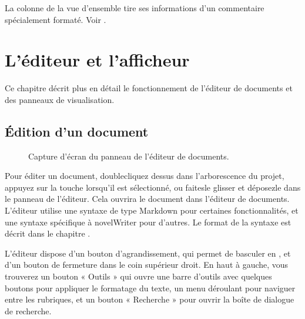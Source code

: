 \documentclass[a4paper,11pt,french]{sphinxmanual}
\begin{document}
\sphinxAtStartPar
La colonne  de la vue d’ensemble tire ses informations d’un commentaire spécialement formaté. Voir {\hyperref[\detokenize{usage_format:a-fmt-comm}]{}}.

\sphinxstepscope


\chapter{L’éditeur et l’afficheur}
\label{\detokenize{usage_writing:the-editor-and-viewer}}\label{\detokenize{usage_writing:a-ui-writing}}\label{\detokenize{usage_writing::doc}}
\sphinxAtStartPar
Ce chapitre décrit plus en détail le fonctionnement de l’éditeur de documents et des panneaux de visualisation.


\section{Édition d’un document}
\label{\detokenize{usage_writing:editing-a-document}}\label{\detokenize{usage_writing:a-ui-edit}}
\begin{figure}[htbp]
\centering
\capstart

\noindent{}
\caption{Capture d’écran du panneau de l’éditeur de documents.}\label{\detokenize{usage_writing:id1}}\end{figure}

\sphinxAtStartPar
Pour éditer un document, double\sphinxhyphen{}cliquez dessus dans l’arborescence du projet, appuyez sur la touche  lorsqu’il est sélectionné, ou faites\sphinxhyphen{}le glisser et déposez\sphinxhyphen{}le dans le panneau de l’éditeur. Cela ouvrira le document dans l’éditeur de documents. L’éditeur utilise une syntaxe de type Markdown pour certaines fonctionnalités, et une syntaxe spécifique à novelWriter pour d’autres. Le format de la syntaxe est décrit dans le chapitre {\hyperref[\detokenize{usage_format:a-fmt}]{}}.

\sphinxAtStartPar
L’éditeur dispose d’un bouton d’agrandissement, qui permet de basculer en , et d’un bouton de fermeture dans le coin supérieur droit. En haut à gauche, vous trouverez un bouton « Outils » qui ouvre une barre d’outils avec quelques boutons pour appliquer le formatage du texte, un menu déroulant pour naviguer entre les rubriques, et un bouton « Recherche » pour ouvrir la boîte de dialogue de recherche.
\end{document}
